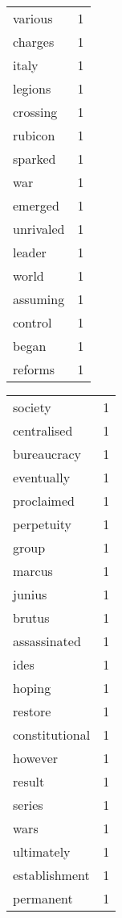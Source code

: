 \begin{center}
\begin{scriptsize}
\begin{tabular}{|ll|}
various       & 1\\%
charges       & 1\\%
italy         & 1\\%
legions       & 1\\%
crossing      & 1\\%
rubicon       & 1\\%
sparked       & 1\\%
war           & 1\\%
emerged       & 1\\%
unrivaled     & 1\\%
leader        & 1\\%
world         & 1\\%
assuming      & 1\\%
control       & 1\\%
began         & 1\\%
reforms       & 1\\%
\hline
\end{tabular}
\begin{tabular}{|ll|}
\hline
society       & 1\\%
centralised   & 1\\%
bureaucracy   & 1\\%
eventually    & 1\\%
proclaimed    & 1\\%
perpetuity    & 1\\%
group         & 1\\%
marcus        & 1\\%
junius        & 1\\%
brutus        & 1\\%
assassinated  & 1\\%
ides          & 1\\%
hoping        & 1\\%
restore       & 1\\%
constitutional& 1\\%
however       & 1\\%
result        & 1\\%
series        & 1\\%
wars          & 1\\%
ultimately    & 1\\%
establishment & 1\\%
permanent     & 1\\%

\end{tabular}
\end{scriptsize}
\end{center}
